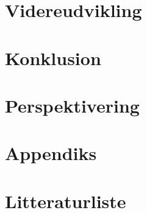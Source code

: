 \chapter{Videreudvikling}

\chapter{Konklusion}

\chapter{Perspektivering}

\chapter{Appendiks}


\chapter{Litteraturliste}

\newpage
\listoffigures
{}
\newpage
\listoftables
{}
\newpage
\printbibliography
\listoffixmes
